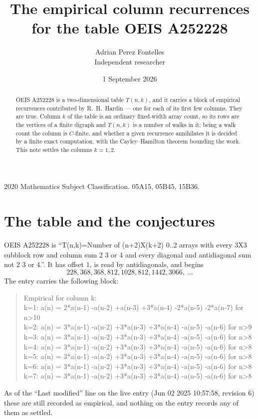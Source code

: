 \documentclass[11pt,a4paper]{article}
\title{The empirical column recurrences for the table OEIS A252228}
\author{Adrian Perez Fontelles\\ \small Independent researcher}
\date{1 September 2026}
\theoremstyle{plain}
\theoremstyle{definition}
\begin{document}
\maketitle

\begin{abstract}
OEIS A252228 is a two-dimensional table $T(n,k)$, and it carries a block of empirical
recurrences contributed by R.~H.~Hardin --- one for each of its first few columns. They are
true. Column $k$ of the table is an ordinary fixed-width array count, so its rows are the
vertices of a finite digraph and $T(n,k)$ is a number of walks in it; being a walk count the
column is $C$-finite, and whether a given recurrence annihilates it is decided by a finite
exact computation, with the Cayley--Hamilton theorem bounding the work. This note settles the columns $k=1, 2$.
\end{abstract}

\noindent\small 2020 Mathematics Subject Classification. 05A15, 05B45, 15B36.\normalsize

\section{The table and the conjectures}

OEIS A252228 is ``T(n,k)=Number of (n+2)X(k+2) 0..2 arrays with every 3X3 subblock row and column sum 2 3 or 4 and every diagonal and antidiagonal sum not 2 3 or 4.''. It has offset $1$, is
read by antidiagonals, and begins
\[
228, 368, 368, 812, 1028, 812, 1442, 3066,\ \dots
\]
The entry carries the following block:
\begin{quote}\small
Empirical for column k:\\
k=1: a(n) = 2*a(n-1) -a(n-2) +a(n-3) +3*a(n-4) -2*a(n-5) -2*a(n-7) for n>10\\
k=2: a(n) = 3*a(n-1) -a(n-2) +3*a(n-3) +3*a(n-4) -a(n-5) -a(n-6) for n>9\\
k=3: a(n) = 3*a(n-1) -a(n-2) +3*a(n-3) +3*a(n-4) -a(n-5) -a(n-6) for n>8\\
k=4: a(n) = 3*a(n-1) -a(n-2) +3*a(n-3) +3*a(n-4) -a(n-5) -a(n-6) for n>8\\
k=5: a(n) = 3*a(n-1) -a(n-2) +3*a(n-3) +3*a(n-4) -a(n-5) -a(n-6) for n>8\\
k=6: a(n) = 3*a(n-1) -a(n-2) +3*a(n-3) +3*a(n-4) -a(n-5) -a(n-6) for n>8\\
k=7: a(n) = 3*a(n-1) -a(n-2) +3*a(n-3) +3*a(n-4) -a(n-5) -a(n-6) for n>8\\
\end{quote}
As of the ``Last modified'' line on the live entry (Jun 02 2025 10:57:58, revision 6) these are still
recorded as empirical, and nothing on the entry records any of them as settled.
\end{document}
